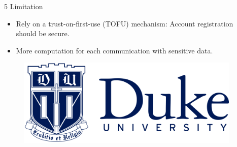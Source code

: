 \documentclass[final]{beamer}
\newlength{\sepwid}
\newlength{\onecolwid}
\begin{document}
\begin{frame}[t]
\begin{columns}[t]
\begin{column}{\onecolwid}
			\begin{block}{5 Limitation}
				\begin{itemize}
					\item Rely on a trust-on-first-use (TOFU) mechanism: Account registration should be secure.
					\item More computation for each communication with sensitive data.
				\end{itemize}
			\end{block}
			\vspace{-0.5in}
			\begin{figure}
				\includegraphics[width=0.5\linewidth]{figures/Duke-long.png}
			\end{figure}
		\end{column} %
														        
		\begin{column}{\sepwid}\end{column} %
																
	\end{columns}
																				
\end{frame} %
\end{document}
